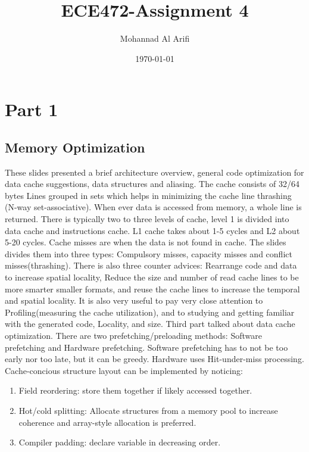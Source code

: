 \documentclass[a4paper]{article}
\title{ECE472-Assignment 4}
\author{Mohannad Al Arifi}
\date{\today}
\begin{document}
\maketitle

\section{Part 1}
\subsection{Memory Optimization}
These slides presented a brief architecture overview, general code optimization for data cache suggestions, data structures and aliasing. The cache consists of 32/64 bytes Lines grouped in sets which helps in minimizing the cache line thrashing (N-way set-associative). When ever data is accessed from memory, a whole line is returned. There is typically two to three levels of cache, level 1 is divided into data cache and instructions cache. L1 cache takes about 1-5 cycles and L2 about 5-20 cycles.
\newline 
Cache misses are when the data is not found in cache. The slides divides them into three types: Compulsory misses, capacity misses and conflict misses(thrashing). There is also three counter advices: Rearrange code and data to increase spatial locality, Reduce the size and number of read cache lines to be more smarter smaller formats, and reuse the cache lines to increase the temporal and spatial locality. It is also very useful to pay very close attention to Profiling(measuring the cache utilization), and to studying and getting familiar with the generated code, Locality, and size.
\newline  
Third part talked about data cache optimization. There are two prefetching/preloading methods: Software prefetching and Hardware prefetching. Software prefetching has to not be too early nor too late, but it can be greedy. Hardware uses Hit-under-miss processing. Cache-concious structure layout can be implemented by noticing:
   \begin{enumerate}
      \item Field reordering: store them together if likely accessed together.
      \item Hot/cold splitting: Allocate structures from a memory pool to increase coherence and array-style allocation is preferred. 
      \item Compiler padding: declare variable in decreasing order.  
   \end{enumerate}
\end{document}
